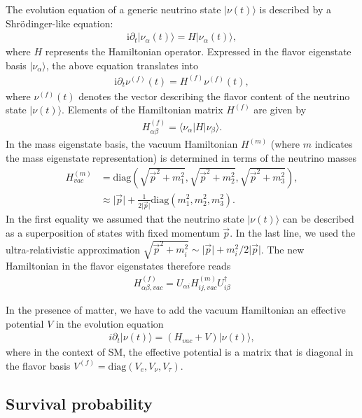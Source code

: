 \documentclass[twocolumn,secnumarabic,amssymb, nobibnotes, aps, prd,10pt]{revtex4-1}
\newcommand{\kt}[1]{\vert #1 \rangle}
\newcommand{\bkt}[3]{\langle #1 \vert #2 \vert #3 \rangle}
\begin{document}
The evolution equation of a generic neutrino state $\kt{\nu(t)}$ is described by a
Shrödinger-like equation:
\begin{align}
\mathrm{i} \partial_t \kt{\nu_\alpha(t)} = H \kt{\nu_\alpha(t)},
\end{align}
where $H$ represents the Hamiltonian operator. Expressed in the flavor eigenstate
basis $\kt{\nu_\alpha}$, the above equation translates into
\begin{align}
\mathrm{i} \partial_t \nu^{(f)}(t) = H^{(f)} \nu^{(f)}(t),
\end{align}
where $\nu^{(f)}(t)$ denotes the vector describing the flavor content of the neutrino state
$\kt{\nu(t)}$. Elements of the Hamiltonian matrix $H^{(f)}$ are given by
\begin{align}
H^{(f)}_{\alpha \beta} = \bkt{\nu_\alpha}{H}{\nu_\beta}.
\end{align}
In the mass eigenstate basis, the vacuum Hamiltonian $H^{(m)}$ (where $m$ indicates the
mass eigenstate representation) is determined in terms of the neutrino masses
\begin{align}
H^{(m)}_{vac} &= \mathrm{diag} \left( \sqrt{\vec{p}^2 + m_1^2}, \sqrt{\vec{p}^2 + m_2^2},
\sqrt{\vec{p}^2 + m_3^2} \right), \nonumber \\
&\approx \vert \vec{p} \vert + \frac{1}{2 \vert \vec{p} \vert} \mathrm{diag} \left( m_1^2, 
m_2^2, m_3^2 \right).
\end{align}
In the first equality we assumed that the neutrino state $\kt{\nu (t)}$ can be described
as a superposition of states with fixed momentum $\vec{p}$. In the last line, we used the
ultra-relativistic approximation $\sqrt{\vec{p}^2 + m_i^2} \sim \vert \vec{p} \vert + m_i^2
/2 \vert \vec{p} \vert$. The new Hamiltonian in the flavor eigenstates therefore reads
\begin{align}
H^{(f)}_{\alpha \beta, vac} = U_{\alpha i} H^{(m)}_{ij, vac} U^\dagger_{i \beta}
\end{align}

In the presence of matter, we have to add the vacuum Hamiltonian an effective potential
$V$ in the evolution equation
\begin{align}
i \partial_t \kt{\nu (t)} = \left( H_{vac} + V \right) \kt{\nu (t)},
\end{align}
where in the context of SM, the effective potential is a matrix that is diagonal in the
flavor basis $V^{(f)} = \mathrm{diag} \left( V_e, V_\nu, V_\tau \right)$.


\subsection{Survival probability}
\label{subsec:survival}
\end{document}
